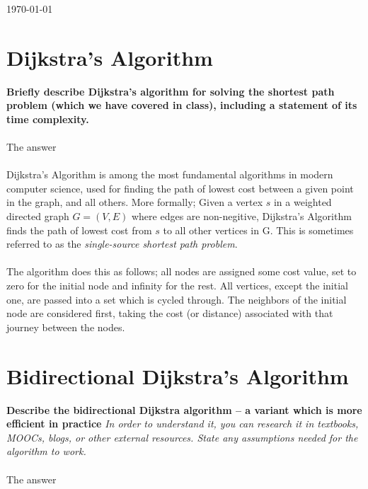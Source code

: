 \documentclass[paper=a4, fontsize=11pt]{scrartcl} %
\begin{document}
\begin{titlepage}

\vspace{5cm}

{\large \today}\\[3cm] %

\vfill %

\end{titlepage}
\clearpage
\setcounter{tocdepth}{1}
\tableofcontents
\clearpage
\twocolumn
\section{Dijkstra's Algorithm}
{\bf Briefly describe Dijkstra's algorithm for solving the shortest path problem
(which we have covered in class), including a statement of its time complexity.}\\\\
{The answer}\\\\
{Dijkstra's Algorithm is among the most fundamental algorithms in modern computer science, used
for finding the path of lowest cost between a given point in the graph, and all others. More
formally; Given a vertex $s$ in a weighted directed graph $G = (V,E)$ where edges are non-negitive, Dijkstra's Algorithm
finds the path of lowest cost from $s$ to all other vertices in G. This is sometimes referred to as the
{\it single-source shortest path problem}. \\\\
The algorithm does this as follows; all nodes are assigned some cost value, set to zero for the initial node
and infinity for the rest. All vertices, except the initial one, are passed into a set which is
cycled through. The neighbors of the initial node are considered first, taking the cost (or distance)
associated with that journey between the nodes.}


\section{Bidirectional Dijkstra's Algorithm}
{\bf Describe the bidirectional Dijkstra algorithm – a variant which is more efficient in practice}
{\it In order to understand it, you can research it in textbooks, MOOCs, blogs,
or other external resources. State any assumptions needed for the algorithm to work.}\\\\
{The answer}
\end{document}
